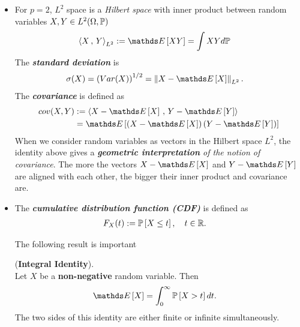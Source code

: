 \documentclass[11pt]{article}
\begin{document}
\begin{itemize}
\item For $p=2$, $L^2$ space is a \emph{Hilbert space} with inner product between random variables $X, Y \in L^2(\Omega, {\mathbb P})$
\begin{align*}
\inn{X}{Y}_{L^2} &:= \E{}{XY} = \int X Y d\bP
\end{align*} The \emph{\textbf{standard deviation}} is 
\begin{align*}
\sigma(X) &= \paren{Var(X) }^{1/2} = \norm{X - \E{}{X}}{L^2}.
\end{align*} The \emph{\textbf{covariance}} is defined as 
\begin{align*}
cov(X, Y) &:= \inn{X- \E{}{X}}{Y - \E{}{Y}} \\
&= \E{}{\paren{X- \E{}{X}}\paren{Y - \E{}{Y}}}
\end{align*} When we consider random variables as vectors in the Hilbert space $L^2$, the identity above gives a \emph{\textbf{geometric interpretation} of the notion of covariance}. The more the vectors $X - \E{}{X}$ and $Y - \E{}{Y}$ are aligned with each other, the bigger their inner product and covariance are.

\item The \emph{\textbf{cumulative distribution function (CDF)}} is defined as
\begin{align*}
F_{X}(t) &:= {\mathbb P}\left[X \le t\right], \quad t\in {\mathbb R}.
\end{align*}

The following result is important 
\begin{lemma} (\textbf{Integral Identity}).  \citep{vershynin2018high}\\
Let $X$ be a \textbf{non-negative} random variable.
Then
\begin{align}
\E{}{X} &= \int_{0}^{\infty}\bP\brac{X > t} dt. \label{eqn: integral_identity}
\end{align}
The two sides of this identity are either finite or infinite simultaneously.
\end{lemma}


\end{itemize}
\end{document}
